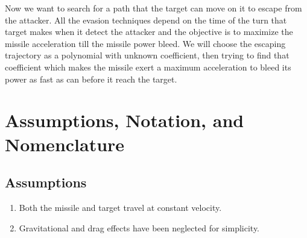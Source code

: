 	
	
	 
	 
	
	



Now we want to search for a path that the target can move on it to escape from the attacker. All the evasion techniques depend on the time of the turn that target makes when it detect the attacker and the objective is to maximize the missile acceleration till the missile power bleed. 
We will  choose the escaping trajectory as a polynomial with unknown coefficient, then trying to find that coefficient which makes the missile exert a maximum acceleration to bleed its power as fast as can before it reach the target.  
\section{Assumptions, Notation, and Nomenclature}
\subsection*{Assumptions}

\begin{enumerate}
	\item Both the missile and target travel at constant velocity.
	\item Gravitational and drag effects have been neglected for simplicity.
\end{enumerate}

